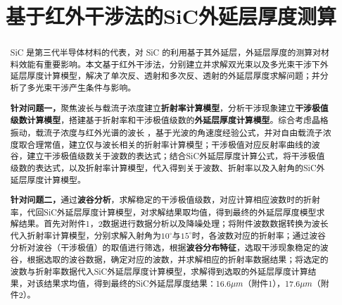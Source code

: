 \documentclass[UTF8]{ctexart}
\title{\textbf{基于红外干涉法的SiC外延层厚度测算}}%
\date{}%
\author{}%
\begin{document}
\setcounter{page}{1}%
\maketitle
\vspace{-0.95cm}
\thispagestyle{fancy}   
\renewcommand{\headrulewidth}{0pt} %
\renewcommand{\abstractname}{\sihao 摘\quad 要} %
\begin{abstract}\xiaosihao
	\vspace{0.1cm}
 SiC 是第三代半导体材料的代表，对 SiC 的利用基于其外延层，外延层厚度的测算对材料效能有重要影响。本文基于红外干涉法，分别建立并求解双光束以及多光束干涉下外延层厚度计算模型，解决了单次反、透射和多次反、透射的外延层厚度求解问题；并分析了多光束干涉产生条件与影响。\par 
 \textbf{针对问题一，}聚焦波长与载流子浓度建立\textbf{折射率计算模型}，分析干涉现象建立\textbf{干涉极值级数计算模型}，搭建基于折射率和干涉极值级数的\textbf{外延层厚度计算模型}。综合考虑晶格振动，载流子浓度与红外光谱的波长
 ，基于光波的角速度经验公式，并对自由载流子浓度取合理常值，建立仅与波长相关的折射率计算模型；干涉极值对应反射率曲线的波谷，建立干涉极值级数关于波数的表达式；结合SiC外延层厚度计算公式，将干涉极值级数的表达式，以及折射率计算模型，代入得到关于波数、折射率以及入射角的SiC外延层厚度计算模型。\par 
 \textbf{针对问题二，}通过\textbf{波谷分析}，求解稳定的干涉极值级数，对应计算相应波数时的折射率，代回SiC外延层厚度计算模型，对求解结果取均值，得到最终的外延层厚度模型求解结果。首先对附件1，2数据进行数据分析以及降噪处理；将附件波数数据转换为波长代入折射率计算模型，分别求解入射角为$10^\circ$与$15^\circ$时，各波数对应的折射率；通过波谷分析对波谷（干涉极值）的取值进行筛选，根据\textbf{波谷分布特征}，选取干涉现象稳定的波谷，根据选取的波谷数据，确定对应的波数，并求解相应的折射率数据结果；将选定的波数与折射率数据代入SiC外延层厚度计算模型，求解得到选取的外延层厚度计算结果，对该结果求均值，得到最终的SiC外延层厚度结果：16.6$\mu m$（附件1），17.6$\mu m$（附件2）。\par 

\end{abstract}
\end{document}
